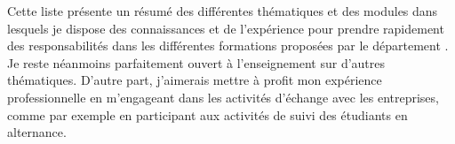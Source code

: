 Cette liste présente un résumé des différentes thématiques et des modules dans
lesquels je dispose des connaissances et de l'expérience pour prendre
rapidement des responsabilités dans les différentes formations proposées par le
département \departement. Je reste néanmoins parfaitement ouvert à
l'enseignement sur d'autres thématiques. D'autre part, j'aimerais mettre à
profit mon expérience professionnelle en m'engageant dans les activités
d'échange avec les entreprises, comme par exemple en participant aux activités
de suivi des étudiants en alternance.

